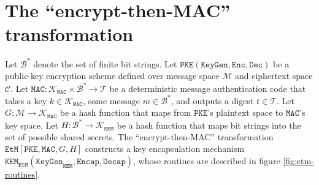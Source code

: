 \documentclass[journal=tches,submission]{iacrtrans}
\newcommand{\pke}{\texttt{PKE}}
\newcommand{\keygen}{\texttt{KeyGen}}
\newcommand{\encrypt}{\texttt{Enc}}
\newcommand{\decrypt}{\texttt{Dec}}
\newcommand{\kem}{\texttt{KEM}}
\newcommand{\encap}{\texttt{Encap}}
\newcommand{\decap}{\texttt{Decap}}
\newcommand{\etm}{\texttt{EtM}}  %
\newcommand{\mac}{\texttt{MAC}}
\begin{document}
\section{The ``encrypt-then-MAC'' transformation}\label{sec:main-results}
Let $\mathcal{B}^\ast$ denote the set of finite bit strings. Let $\pke(\keygen, \encrypt, \decrypt)$ be a public-key encryption scheme defined over message space $\mathcal{M}$ and ciphertext space $\mathcal{C}$. Let $\mac: \mathcal{K}_\mac \times \mathcal{B}^\ast \rightarrow \mathcal{T}$ be a deterministic message authentication code that takes a key $k \in \mathcal{K}_\mac$, some message $m \in \mathcal{B}^\ast$, and outputs a digest $t \in \mathcal{T}$. Let $G: \mathcal{M} \rightarrow \mathcal{K}_\mac$ be a hash function that maps from $\pke$'s plaintext space to $\mac$'s key space. Let $H: \mathcal{B}^\ast \rightarrow \mathcal{K}_\kem$ be a hash function that maps bit strings into the set of possible shared secrets. The ``encrypt-then-MAC'' transformation $\etm[\pke, \mac, G, H]$ constructs a key encapsulation mechanism $\kem_\etm(\keygen_\kem, \encap, \decap)$, whose routines are described in figure \ref{fig:etm-routines}.
\end{document}

